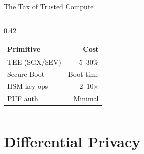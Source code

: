 \documentclass[aspectratio=169, 12pt]{beamer}
\begin{document}
\begin{frame}{The Tax of Trusted Compute}
\begin{columns}[T]
\begin{column}{0.42\textwidth}
    \vspace{0.1cm}
    {\footnotesize
    \renewcommand{\arraystretch}{1.15}
    \begin{tabular}{@{}lr@{}}
      \toprule
      \textbf{Primitive} & \textbf{Cost} \\
      \midrule
      TEE (SGX/SEV) & 5--30\% \\
      Secure Boot   & Boot time \\
      HSM key ops   & 2--10$\times$ \\
      PUF auth      & Minimal \\
      \bottomrule
    \end{tabular}
    }
  \end{column}
\end{columns}

\end{frame}

\section{Differential Privacy}

\end{document}
